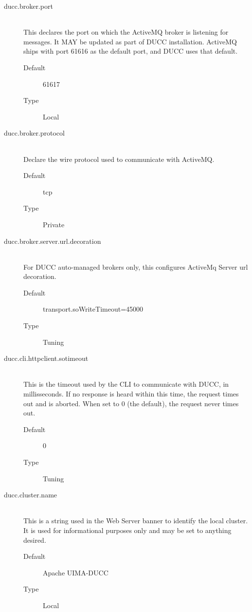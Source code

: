 \begin{description}
       \item[ducc.broker.port] \hfill \\
         This declares the port on which the ActiveMQ broker is listening for
         messages. It MAY be updated as part of DUCC installation. ActiveMQ ships with port
         61616 as the default port, and DUCC uses that default.         
         \begin{description}
           \item[Default] 61617              
           \item[Type] Local 
         \end{description}
             

       \item[ducc.broker.protocol] \hfill \\
         Declare the wire protocol used to communicate with ActiveMQ. 
         \begin{description}
           \item[Default] tcp 
           \item[Type] Private 
         \end{description}


       \item[ducc.broker.server.url.decoration] \hfill \\
         For DUCC auto-managed brokers only, this configures ActiveMq Server url decoration.
         
         \begin{description}
           \item[Default] transport.soWriteTimeout=45000
           \item[Type] Tuning
         \end{description} 

       \item[ducc.cli.httpclient.sotimeout] \hfill \\
         This is the timeout used by the CLI to communicate with DUCC, in millisseconds. If no 
         response is heard within this time, the request times out and is aborted. When set to 0 (the 
         default), the request never times out. 
         \begin{description}
           \item[Default] 0 
           \item[Type] Tuning 
          \end{description}

       \item[ducc.cluster.name] \hfill \\
         This is a string used in the Web Server banner to identify the local cluster. It is used
         for informational purposes only and may be set to anything desired.
         \begin{description}
           \item[Default] Apache UIMA-DUCC
           \item[Type] Local 
         \end{description}
          

\end{description}
